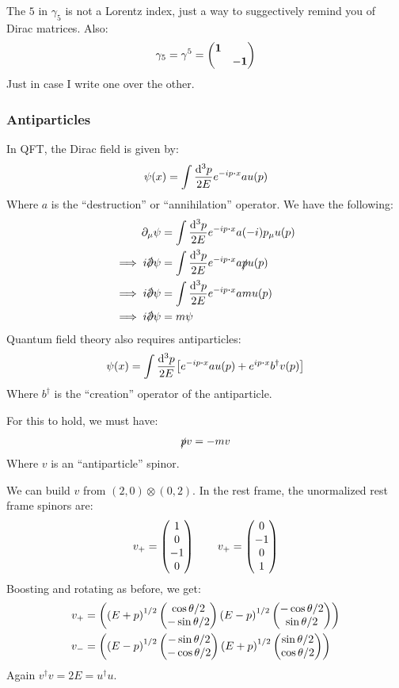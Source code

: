 \begin{aside}
  The $5$ in $\gamma_5$ is not a Lorentz index, just a way to suggectively remind you of Dirac matrices. Also:
  \begin{align*}
    \gamma_5=\gamma^5=\pmqty{\bm{1}\\&-\bm{1}}
  \end{align*}
  Just in case I write one over the other.
\end{aside}

\subsubsection{Antiparticles}
In QFT, the Dirac field is given by:
\begin{align*}
  \psi(x)=\int\frac{\dd[3]{p}}{2E}e^{-ip\vdot x}a u(p)
\end{align*}
Where $a$ is the ``destruction'' or ``annihilation'' operator. We have the following:
\begin{align*}
  \D_\mu\psi&=\int\frac{\dd[3]{p}}{2E}e^{-ip\vdot x}a(-i)p_\mu u(p)\\
  \implies i\sla{\D}\psi&=\int\frac{\dd[3]{p}}{2E}e^{-ip\vdot x}a\sla{p}u(p)\\
  \implies i\sla{\D}\psi&=\int\frac{\dd[3]{p}}{2E}e^{-ip\vdot x}amu(p)\\
  \implies i\sla{\D}\psi&=m\psi
\end{align*}
Quantum field theory also requires antiparticles:
\begin{align*}
  \psi(x)=\int\frac{\dd[3]{p}}{2E}
  \qty[e^{-ip\vdot x}a u(p)+e^{ip\vdot x}b^\dag v(p)]
\end{align*}
Where $b^\dag$ is the ``creation'' operator of the antiparticle.

For this to hold, we must have:
\begin{align*}
  \slashed{p} v= -mv
\end{align*}
Where $v$ is an ``antiparticle'' spinor.

We can build $v$ from $(2,0)\otimes(0,2)$. In the rest frame, the unormalized rest frame spinors are:
\begin{align*}
  v_+=\pmqty{1\\0\\-1\\0}\qquad
  v_+=\pmqty{0\\-1\\0\\1}
\end{align*}
Boosting and rotating as before, we get:
\begin{align*}
  v_{+}&=\pmqty{
    {(E+p)}^{1/2}\pmqty{\cos\theta/2\\-\sin\theta/2}
    {(E-p)}^{1/2}\pmqty{-\cos\theta/2\\\sin\theta/2}
  }\\
  v_{-}&=\pmqty{
    {(E-p)}^{1/2}\pmqty{-\sin\theta/2\\-\cos\theta/2}
    {(E+p)}^{1/2}\pmqty{\sin\theta/2\\\cos\theta/2}
  }
\end{align*}
Again $v^\dag v=2E=u^\dag u$.

